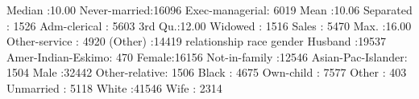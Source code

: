 \documentclass[
  11pt,
]{book}
\makeatletter
\newenvironment{Shaded}{}{}
\newcommand{\ControlFlowTok}[1]{\textcolor[rgb]{0.07,0.07,0.07}{#1}}
\newcommand{\DecValTok}[1]{#1}
\newcommand{\FloatTok}[1]{#1}
\newcommand{\NormalTok}[1]{#1}
\newcommand{\SpecialCharTok}[1]{\textcolor[rgb]{0.39,0.39,0.39}{#1}}
\newenvironment{kframe}{%
\medskip{}
\setlength{\fboxsep}{.8em}
 \def\at@end@of@kframe{}%
 \ifinner\ifhmode%
  \def\at@end@of@kframe{\end{minipage}}%
  \begin{minipage}{\columnwidth}%
 \fi\fi%
 \def\FrameCommand##1{\hskip\@totalleftmargin \hskip-\fboxsep
 \colorbox{shadecolor}{##1}\hskip-\fboxsep
     \hskip-\linewidth \hskip-\@totalleftmargin \hskip\columnwidth}%
 \MakeFramed {\advance\hsize-\width
   \@totalleftmargin\z@ \linewidth\hsize
   \@setminipage}}%
 {\par\unskip\endMakeFramed%
 \at@end@of@kframe}
\renewenvironment{Shaded}{\begin{kframe}}{\end{kframe}}
\theoremstyle{definition}
\theoremstyle{definition}
\theoremstyle{definition}
\theoremstyle{definition}
\theoremstyle{remark}
\makeatother
\begin{document}
\begin{Shaded}
\begin{Highlighting}[]
\NormalTok{    Median }\SpecialCharTok{:}\FloatTok{10.00}\NormalTok{   Never}\SpecialCharTok{{-}}\NormalTok{married}\SpecialCharTok{:}\DecValTok{16096}\NormalTok{   Exec}\SpecialCharTok{{-}}\NormalTok{managerial}\SpecialCharTok{:} \DecValTok{6019}  
\NormalTok{    Mean   }\SpecialCharTok{:}\FloatTok{10.06}\NormalTok{   Separated    }\SpecialCharTok{:} \DecValTok{1526}\NormalTok{   Adm}\SpecialCharTok{{-}}\NormalTok{clerical   }\SpecialCharTok{:} \DecValTok{5603}  
    \DecValTok{3}\NormalTok{rd Qu.}\SpecialCharTok{:}\FloatTok{12.00}\NormalTok{   Widowed      }\SpecialCharTok{:} \DecValTok{1516}\NormalTok{   Sales          }\SpecialCharTok{:} \DecValTok{5470}  
\NormalTok{    Max.   }\SpecialCharTok{:}\FloatTok{16.00}\NormalTok{                         Other}\SpecialCharTok{{-}}\NormalTok{service  }\SpecialCharTok{:} \DecValTok{4920}  
\NormalTok{                                          (Other)        }\SpecialCharTok{:}\DecValTok{14419}  
\NormalTok{            relationship                   race          gender     }
\NormalTok{    Husband       }\SpecialCharTok{:}\DecValTok{19537}\NormalTok{   Amer}\SpecialCharTok{{-}}\NormalTok{Indian}\SpecialCharTok{{-}}\NormalTok{Eskimo}\SpecialCharTok{:}  \DecValTok{470}\NormalTok{   Female}\SpecialCharTok{:}\DecValTok{16156}  
\NormalTok{    Not}\SpecialCharTok{{-}}\ControlFlowTok{in}\SpecialCharTok{{-}}\NormalTok{family }\SpecialCharTok{:}\DecValTok{12546}\NormalTok{   Asian}\SpecialCharTok{{-}}\NormalTok{Pac}\SpecialCharTok{{-}}\NormalTok{Islander}\SpecialCharTok{:} \DecValTok{1504}\NormalTok{   Male  }\SpecialCharTok{:}\DecValTok{32442}  
\NormalTok{    Other}\SpecialCharTok{{-}}\NormalTok{relative}\SpecialCharTok{:} \DecValTok{1506}\NormalTok{   Black             }\SpecialCharTok{:} \DecValTok{4675}                 
\NormalTok{    Own}\SpecialCharTok{{-}}\NormalTok{child     }\SpecialCharTok{:} \DecValTok{7577}\NormalTok{   Other             }\SpecialCharTok{:}  \DecValTok{403}                 
\NormalTok{    Unmarried     }\SpecialCharTok{:} \DecValTok{5118}\NormalTok{   White             }\SpecialCharTok{:}\DecValTok{41546}                 
\NormalTok{    Wife          }\SpecialCharTok{:} \DecValTok{2314}                                            
                                                                    

\end{Highlighting}
\end{Shaded}
\end{document}
